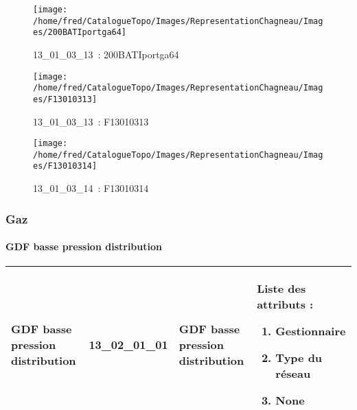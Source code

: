\documentclass[12pt,titlepage,oneside]{book}
\begin{document}
\begin{figure}[h!]
\begin{minipage}[t]{3cm}
  \end{minipage}
  \begin{minipage}[t]{3cm}
    \begin{center}
      \texttt{[image: /home/fred/CatalogueTopo/Images/RepresentationChagneau/Images/200BATIportga64]}
      \caption[~13\_01\_03\_13]{\small{13\_01\_03\_13~:} \tiny{200BATIportga64}}\label{200BATIportga64}
    \end{center}
  \end{minipage}
  \begin{minipage}[t]{3cm}
    \begin{center}
      \texttt{[image: /home/fred/CatalogueTopo/Images/RepresentationChagneau/Images/F13010313]}
      \caption[~13\_01\_03\_13]{\small{13\_01\_03\_13~:} \tiny{F13010313}}\label{F13010313}
    \end{center}
  \end{minipage}
  \begin{minipage}[t]{3cm}
    \begin{center}
      \texttt{[image: /home/fred/CatalogueTopo/Images/RepresentationChagneau/Images/F13010314]}
      \caption[~13\_01\_03\_14]{\small{13\_01\_03\_14~:} \tiny{F13010314}}\label{F13010314}
    \end{center}
  \end{minipage}
\end{figure}

\subsubsection{\large Gaz}
\paragraph{GDF basse pression distribution}
\noindent
\vspace{\baselineskip}

\renewcommand{\arraystretch}{1.2}
\begin{supertabular}{|p{10cm}|c|p{13cm}|p{12cm}|}
 GDF basse pression distribution & 13\_02\_01\_01 & GDF basse pression distribution & Liste des attributs :
\begin{enumerate}
  \item Gestionnaire  \item Type du réseau  \item None\end{enumerate}
\\
\hline
\end{supertabular}
\begin{figure}[h!]
  \hfill         %
\end{figure}
\end{document}
